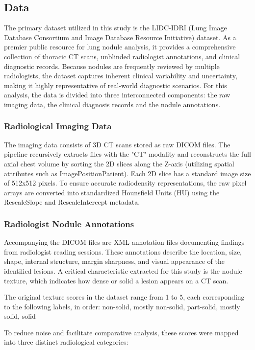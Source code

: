 \subsection{Data}
\label{section:data}


The primary dataset utilized in this study is the LIDC-IDRI (Lung Image Database Consortium and Image Database Resource Initiative) dataset. As a premier public resource for lung nodule analysis, it provides a comprehensive collection of thoracic CT scans, unblinded radiologist annotations, and clinical diagnostic records. Because nodules are frequently reviewed by multiple radiologists, the dataset captures inherent clinical variability and uncertainty, making it highly representative of real-world diagnostic scenarios. For this analysis, the data is divided into three interconnected components: the raw imaging data, the clinical diagnosis records and the nodule annotations.

\subsubsection{Radiological Imaging Data}
The imaging data consists of 3D CT scans stored as raw DICOM files. The pipeline recursively extracts files with the "CT" modality and reconstructs the full axial chest volume by sorting the 2D slices along the Z-axis (utilizing spatial attributes such as ImagePositionPatient). Each 2D slice has a standard image size of 512x512 pixels. To ensure accurate radiodensity representations, the raw pixel arrays are converted into standardized Hounsfield Units (HU) using the RescaleSlope and RescaleIntercept metadata.

\subsubsection{Radiologist Nodule Annotations}
Accompanying the DICOM files are XML annotation files documenting findings from radiologist reading sessions. These annotations describe the location, size, shape, internal structure, margin sharpness, and visual appearance of the identified lesions. A critical characteristic extracted for this study is the nodule texture, which indicates how dense or solid a lesion appears on a CT scan.

The original texture scores in the dataset range from 1 to 5, each corresponding to the following labels, in order: non-solid, mostly non-solid, part-solid, mostly solid, solid

To reduce noise and facilitate comparative analysis, these scores were mapped into three distinct radiological categories:

